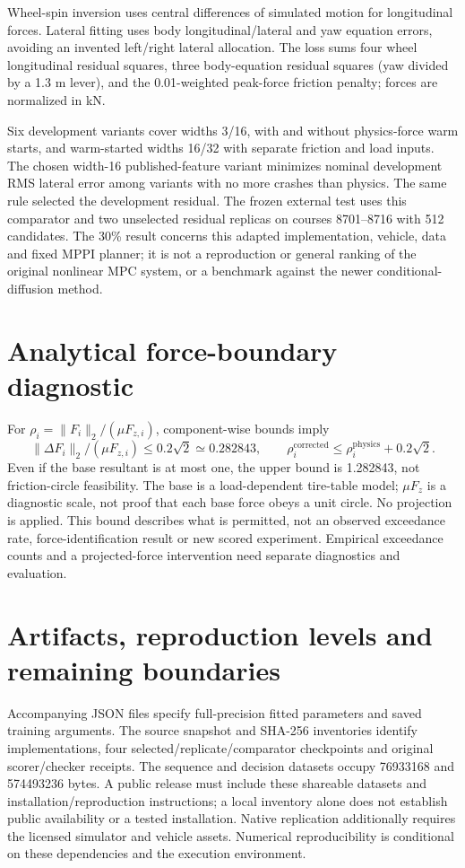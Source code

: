 \documentclass[11pt]{article}
\begin{document}
Wheel-spin inversion uses central differences of simulated motion for longitudinal forces. Lateral fitting uses body longitudinal/lateral and yaw equation errors, avoiding an invented left/right lateral allocation. The loss sums four wheel longitudinal residual squares, three body-equation residual squares (yaw divided by a 1.3 m lever), and the 0.01-weighted peak-force friction penalty; forces are normalized in kN.

Six development variants cover widths 3/16, with and without physics-force warm starts, and warm-started widths 16/32 with separate friction and load inputs. The chosen width-16 published-feature variant minimizes nominal development RMS lateral error among variants with no more crashes than physics. The same rule selected the development residual. The frozen external test uses this comparator and two unselected residual replicas on courses 8701--8716 with 512 candidates. The 30\% result concerns this adapted implementation, vehicle, data and fixed MPPI planner; it is not a reproduction or general ranking of the original nonlinear MPC system, or a benchmark against the newer conditional-diffusion method.

\section{Analytical force-boundary diagnostic}
For $\rho_i=\|F_i\|_2/(\mu F_{z,i})$, component-wise bounds imply
\[
\|\Delta F_i\|_2/(\mu F_{z,i})\leq0.2\sqrt2\simeq0.282843,
\qquad \rho_i^{\mathrm{corrected}}\leq\rho_i^{\mathrm{physics}}+0.2\sqrt2.
\]
Even if the base resultant is at most one, the upper bound is 1.282843, not friction-circle feasibility. The base is a load-dependent tire-table model; $\mu F_z$ is a diagnostic scale, not proof that each base force obeys a unit circle. No projection is applied. This bound describes what is permitted, not an observed exceedance rate, force-identification result or new scored experiment. Empirical exceedance counts and a projected-force intervention need separate diagnostics and evaluation.

\section{Artifacts, reproduction levels and remaining boundaries}
Accompanying JSON files specify full-precision fitted parameters and saved training arguments. The source snapshot and SHA-256 inventories identify implementations, four selected/replicate/comparator checkpoints and original scorer/checker receipts. The sequence and decision datasets occupy 76933168 and 574493236 bytes. A public release must include these shareable datasets and installation/reproduction instructions; a local inventory alone does not establish public availability or a tested installation. Native replication additionally requires the licensed simulator and vehicle assets. Numerical reproducibility is conditional on these dependencies and the execution environment.
\end{document}

